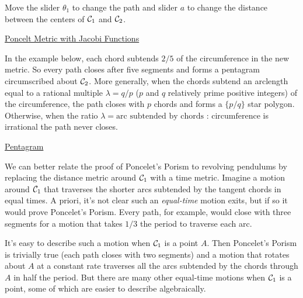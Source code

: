 \documentclass{ximera}
\begin{document}
\begin{exploration}
Move the slider $\theta_1$ to change the path and slider $a$ to change the distance between the centers of ${\cal C}_1$ and ${\cal C}_2$.
 
\begin{onlineOnly}
    \begin{center}
\end{center}
\end{onlineOnly}

\href{https://www.desmos.com/calculator/wzctareiln}{Poncelt Metric with Jacobi Functions}

\end{exploration}

In the example below, each chord subtends $2/5$ of the circumference in the new metric. So every path closes after five segments and forms a pentagram circumscribed about ${\cal C}_2$. More generally, when the chords subtend an arclength equal to a rational multiple $\lambda = q/p$ ($p$ and $q$ relatively prime positive integers) of the circumference, the path closes with $p$ chords and forms a $\{p/q \}$ star polygon. Otherwise, when the ratio $\lambda = \text{arc subtended by chords : circumference}$ is irrational the path never closes.

\begin{exploration}
\begin{onlineOnly}
    \begin{center}
\end{center}
\end{onlineOnly}

\href{https://www.desmos.com/calculator/qco4rghhfi}{Pentagram}

\end{exploration}

We can better relate the proof of Poncelet's Porism to revolving pendulums by replacing the distance metric around ${\cal C}_1$ with a time metric. Imagine a motion around ${\cal C}_1$ that traverses the shorter arcs subtended by the tangent chords in equal times. A priori, it's not clear such an \emph{equal-time} motion exits, but if so it would prove Poncelet's Porism. Every path, for example, would close with three segments for a motion that takes $1/3$ the period to traverse each arc. %

It's easy to describe such a motion when ${\cal C}_1$ is a point $A$. Then Poncelet's Porism is trivially true (each path closes with two segments) and a motion that rotates about $A$ at a constant rate traverses all the arcs subtended by the chords through $A$ in half the period. But there are many other equal-time motions when ${\cal C}_1$ is a point, some of which are easier to describe algebraically. 
\end{document}
